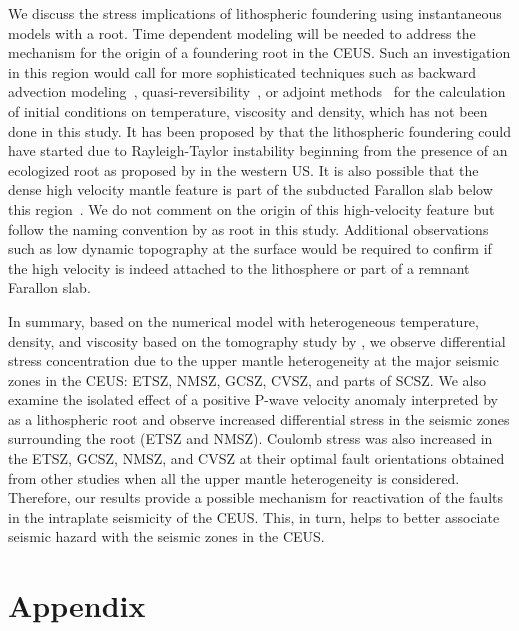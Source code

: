 \documentclass[draft,linenumbers]{agujournal2018}
\begin{document}
    
    We discuss the stress implications of lithospheric foundering using instantaneous models with a root. Time dependent modeling will be needed to address the mechanism for the origin of a foundering root in the CEUS. Such an investigation in this region would call for more sophisticated techniques such as backward advection modeling~\citep[e.g.,][]{conrad2003seismic}, quasi-reversibility~\citep{glivsovic2016new}, or adjoint methods~\citep[e.g.,][]{bunge2003mantle, liu2008reconstructing} for the calculation of initial conditions on temperature, viscosity and density, which has not been done in this study. It has been proposed by \cite{Biryol_2016} that the lithospheric foundering could have started due to Rayleigh-Taylor instability beginning from the presence of an ecologized root as proposed by \citet{le2006mantle} in the western US. It is also possible that the dense high velocity mantle feature is part of the subducted Farallon slab below this region~\citep{schmandt2010seismic}. We do not comment on the origin of this high-velocity feature but follow the naming convention by \citet{Biryol_2016} as root in this study. Additional observations such as low dynamic topography at the surface would be required to confirm if the high velocity is indeed attached to the lithosphere or part of a remnant Farallon slab.
    
    In summary, based on the numerical model with heterogeneous temperature, density, and viscosity based on the tomography study by \citet{Biryol_2016}, we observe differential stress concentration due to the upper mantle heterogeneity at the major seismic zones in the CEUS: ETSZ, NMSZ, GCSZ, CVSZ, and parts of SCSZ. We also examine the isolated effect of a positive P-wave velocity anomaly interpreted by \citet{Biryol_2016} as a lithospheric root and observe increased differential stress in the seismic zones surrounding the root (ETSZ and NMSZ). Coulomb stress was also increased in the ETSZ, GCSZ, NMSZ, and CVSZ at their optimal fault orientations obtained from other studies when all the upper mantle heterogeneity is considered. Therefore, our results provide a possible mechanism for reactivation of the faults in the intraplate seismicity of the CEUS. This, in turn, helps to better associate seismic hazard with the seismic zones in the CEUS.
    
\appendix
\section{Appendix}
\end{document}
